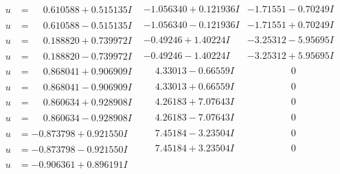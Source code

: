 \documentclass[1p]{elsarticle_modified}
\theoremstyle{definition}
\begin{document}
$$\begin{array}{c|c|c}
 \hline 
\begin{aligned}
u &= \phantom{-}0.610588 + 0.515135 I\end{aligned}
 & -1.056340 + 0.121936 I & -1.71551 - 0.70249 I \\ \hline\begin{aligned}
u &= \phantom{-}0.610588 - 0.515135 I\end{aligned}
 & -1.056340 - 0.121936 I & -1.71551 + 0.70249 I \\ \hline\begin{aligned}
u &= \phantom{-}0.188820 + 0.739972 I\end{aligned}
 & -0.49246 + 1.40224 I & -3.25312 - 5.95695 I \\ \hline\begin{aligned}
u &= \phantom{-}0.188820 - 0.739972 I\end{aligned}
 & -0.49246 - 1.40224 I & -3.25312 + 5.95695 I \\ \hline\begin{aligned}
u &= \phantom{-}0.868041 + 0.906909 I\end{aligned}
 & \phantom{-}4.33013 - 0.66559 I & \phantom{-0.000000 } 0 \\ \hline\begin{aligned}
u &= \phantom{-}0.868041 - 0.906909 I\end{aligned}
 & \phantom{-}4.33013 + 0.66559 I & \phantom{-0.000000 } 0 \\ \hline\begin{aligned}
u &= \phantom{-}0.860634 + 0.928908 I\end{aligned}
 & \phantom{-}4.26183 + 7.07643 I & \phantom{-0.000000 } 0 \\ \hline\begin{aligned}
u &= \phantom{-}0.860634 - 0.928908 I\end{aligned}
 & \phantom{-}4.26183 - 7.07643 I & \phantom{-0.000000 } 0 \\ \hline\begin{aligned}
u &= -0.873798 + 0.921550 I\end{aligned}
 & \phantom{-}7.45184 - 3.23504 I & \phantom{-0.000000 } 0 \\ \hline\begin{aligned}
u &= -0.873798 - 0.921550 I\end{aligned}
 & \phantom{-}7.45184 + 3.23504 I & \phantom{-0.000000 } 0 \\ \hline\begin{aligned}
u &= -0.906361 + 0.896191 I\end{aligned}

\end{array}$$
\end{document}

